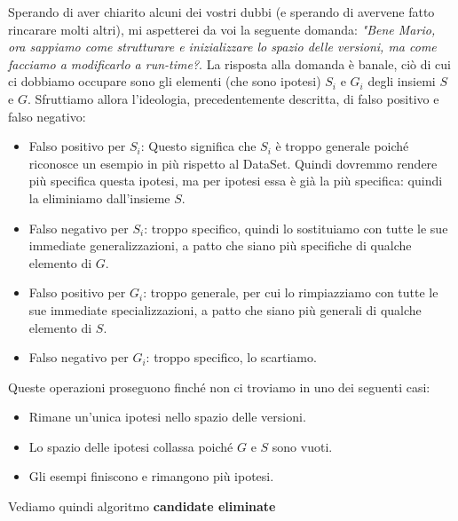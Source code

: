  Sperando di aver chiarito alcuni dei vostri dubbi (e sperando di avervene fatto rincarare molti altri), mi aspetterei da voi la seguente domanda: \textit{"Bene Mario, ora sappiamo come strutturare e inizializzare lo spazio delle versioni, ma come facciamo a modificarlo a run-time?}. La risposta alla domanda è banale, ciò di cui ci dobbiamo occupare sono gli elementi (che sono ipotesi) $S_i$ e $G_i$ degli insiemi $S$ e $G$. Sfruttiamo allora l'ideologia, precedentemente descritta, di falso positivo e falso negativo:
 \begin{itemize}
     \item Falso positivo per $S_i$: Questo significa che $S_i$ è troppo generale poiché riconosce un esempio in più rispetto al DataSet. Quindi dovremmo rendere più specifica questa ipotesi, ma per ipotesi essa è già la più specifica: quindi la eliminiamo dall'insieme $S$.
     \item Falso negativo per $S_i$: troppo specifico, quindi lo sostituiamo con tutte le sue immediate generalizzazioni, a patto che siano più specifiche di qualche elemento di $G$.
     \item Falso positivo per $G_i$: troppo generale, per cui lo rimpiazziamo con tutte le sue immediate specializzazioni, a patto che siano più generali di qualche elemento di $S$.
     \item Falso negativo per $G_i$: troppo specifico, lo scartiamo.
 \end{itemize}
 Queste operazioni proseguono finché non ci troviamo in uno dei seguenti casi:
 \begin{itemize}
     \item Rimane un'unica ipotesi nello spazio delle versioni.
     \item Lo spazio delle ipotesi collassa poiché $G$ e $S$ sono vuoti.
     \item Gli esempi finiscono e rimangono più ipotesi.
 \end{itemize}
    Vediamo quindi algoritmo \textbf{candidate eliminate}

